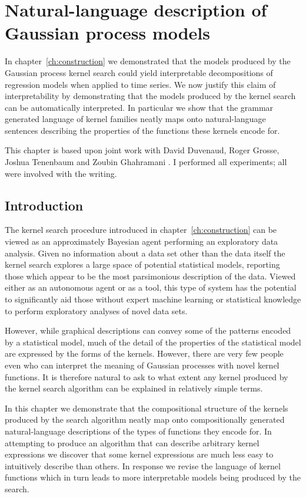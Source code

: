 
\inbpdocument

\chapter{Natural-language description of Gaussian process models}
\label{ch:description}

In chapter~\ref{ch:construction} we demonstrated that the models produced by the Gaussian process kernel search could yield interpretable decompositions of regression models when applied to time series.
We now justify this claim of interpretability by demonstrating that the models produced by the kernel search can be automatically interpreted.
In particular we show that the grammar generated language of kernel families neatly maps onto natural-language sentences describing the properties of the functions these kernels encode for.

This chapter is based upon joint work with David Duvenaud, Roger Grosse, Joshua Tenenbaum and Zoubin Ghahramani \citep{Lloyd2014-nz}.
I performed all experiments; all were involved with the writing.

\section{Introduction}

The kernel search procedure introduced in chapter~\ref{ch:construction} can be viewed as an approximately Bayesian agent performing an exploratory data analysis.
Given no information about a data set other than the data itself the kernel search explores a large space of potential statistical models, reporting those which appear to be the most parsimonious description of the data.
Viewed either as an autonomous agent or as a tool, this type of system has the potential to significantly aid those without expert machine learning or statistical knowledge to perform exploratory analyses of novel data sets.

However, while graphical descriptions can convey some of the patterns encoded by a statistical model, much of the detail of the properties of the statistical model are expressed by the forms of the kernels.
However, there are very few people even who can interpret the meaning of Gaussian processes with novel kernel functions.
It is therefore natural to ask to what extent any kernel produced by the kernel search algorithm can be explained in relatively simple terms.

In this chapter we demonstrate that the compositional structure of the kernels produced by the search algorithm neatly map onto compositionally generated natural-language descriptions of the types of functions they encode for.
In attempting to produce an algorithm that can describe arbitrary kernel expressions we discover that some kernel expressions are much less easy to intuitively describe than others.
In response we revise the language of kernel functions which in turn leads to more interpretable models being produced by the search.

